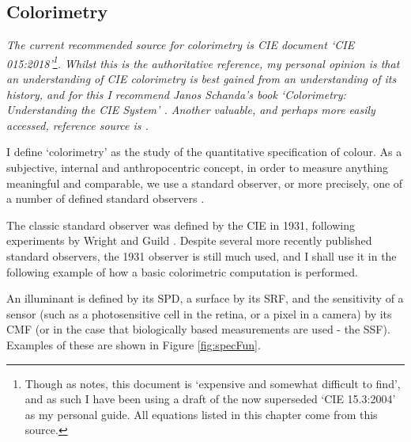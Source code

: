 \subsection{Colorimetry}

\textit{The current recommended source for colorimetry is \gls{CIE} document `\gls{CIE} 015:2018'\citep{cie_cie_2018}\footnote{Though as \citet{fairchild_cie_2019} notes, this document is `expensive and somewhat difficult to find', and as such I have been using a draft of the now superseded `\gls{CIE} 15.3:2004'\citep{cie_cie_2004-2} as my personal guide. All equations listed in this chapter come from this source.}. Whilst this is the authoritative reference, my personal opinion is that an understanding of \gls{CIE} colorimetry is best gained from an understanding of its history, and for this I recommend Janos Schanda's book `Colorimetry: Understanding the \gls{CIE} System' \citep{schanda_colorimetry_2007}. Another valuable, and perhaps more easily accessed, reference source is \citet{stockman_color_2010}.}

\bigskip

I define `colorimetry' as the study of the quantitative specification of colour. As a subjective, internal and anthropocentric concept, in order to measure anything meaningful and comparable, we use a standard observer, or more precisely, one of a number of defined standard observers \cite{cie_bs_2011}.

The classic standard observer was defined by the \gls{CIE} in 1931, following experiments by Wright and Guild \cite{wright_re-determination_1929, guild_colorimetric_1931}. Despite several more recently published standard observers, the 1931 observer is still much used, and I shall use it in the following example of how a basic colorimetric computation is performed.


An illuminant is defined by its \gls{SPD}, a surface by its \gls{SRF}, and the sensitivity of a sensor (such as a photosensitive cell in the retina, or a pixel in a camera) by its \gls{CMF} (or in the case that biologically based measurements are used - the \gls{SSF}). Examples of these are shown in Figure \ref{fig:specFun}.

